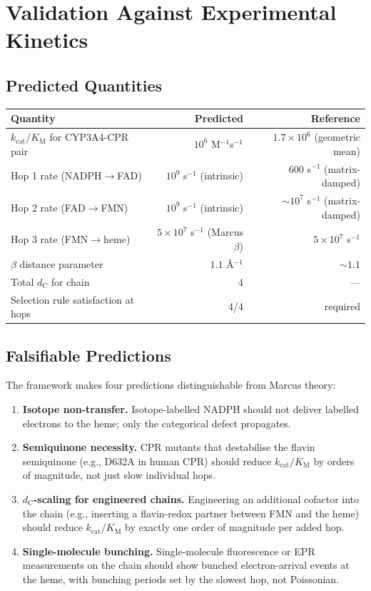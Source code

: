 \documentclass[11pt,twocolumn,a4paper]{article}
\theoremstyle{definition}
\theoremstyle{remark}
\newcommand{\dC}{d_{\mathrm{C}}}
\newcommand{\kcat}{k_{\mathrm{cat}}}
\newcommand{\KM}{K_{\mathrm{M}}}
\begin{document}
\section{Validation Against Experimental Kinetics}
\label{sec:validation}

\subsection{Predicted Quantities}

\begin{center}
\small
\begin{tabular}{lrr}
\toprule
Quantity & Predicted & Reference \\
\midrule
$\kcat/\KM$ for CYP3A4-CPR pair & $10^6$ M$^{-1}$s$^{-1}$ & $1.7 \times 10^6$ (geometric mean) \\
Hop 1 rate (NADPH$\to$FAD) & $10^9$ s$^{-1}$ (intrinsic) & 600 s$^{-1}$ (matrix-damped) \\
Hop 2 rate (FAD$\to$FMN) & $10^9$ s$^{-1}$ (intrinsic) & $\sim 10^7$ s$^{-1}$ (matrix-damped) \\
Hop 3 rate (FMN$\to$heme) & $5 \times 10^7$ s$^{-1}$ (Marcus $\beta$) & $5 \times 10^7$ s$^{-1}$ \citep{denisov2007} \\
$\beta$ distance parameter & $1.1$ \AA$^{-1}$ & $\sim 1.1$ \citep{moser1992} \\
Total $\dC$ for chain & 4 & --- \\
Selection rule satisfaction at hops & 4/4 & required \\
\bottomrule
\end{tabular}
\end{center}

\subsection{Falsifiable Predictions}

The framework makes four predictions distinguishable from Marcus theory:

\begin{enumerate}[nosep, leftmargin=*]
\item \textbf{Isotope non-transfer.} Isotope-labelled NADPH should not
  deliver labelled electrons to the heme; only the categorical defect
  propagates.
\item \textbf{Semiquinone necessity.} CPR mutants that destabilise the
  flavin semiquinone (e.g., D632A in human CPR) should reduce $\kcat/\KM$
  by orders of magnitude, not just slow individual hops.
\item \textbf{$\dC$-scaling for engineered chains.} Engineering an
  additional cofactor into the chain (e.g., inserting a flavin-redox
  partner between FMN and the heme) should reduce $\kcat/\KM$ by exactly
  one order of magnitude per added hop.
\item \textbf{Single-molecule bunching.} Single-molecule fluorescence or
  EPR measurements on the chain should show bunched electron-arrival
  events at the heme, with bunching periods set by the slowest hop, not
  Poissonian.
\end{enumerate}
\end{document}
